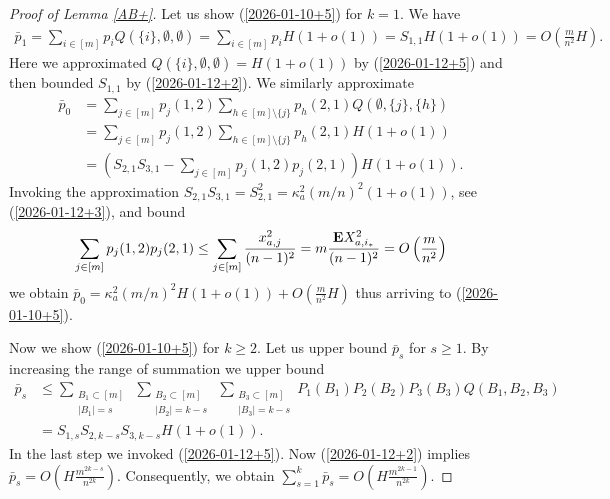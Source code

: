 \documentclass[10pt,a4paper]{amsart}
\newcommand{\E}{{\bf{E}}}
\begin{document}
\begin{proof}[ Proof of Lemma \ref{AB+}]
Let us show (\ref{2026-01-10+5}) for $k=1$. 
We have
\begin{align*}
{\bar p}_1
=
\sum_{i\in [m]}p_iQ(\{i\},\emptyset,\emptyset)
=
\sum_{i\in [m]}p_iH(1+o(1))
=
S_{1,1}H(1+o(1))
=
O\left(\frac{m}{n^2}H\right).
\end{align*}
Here we approximated $Q(\{i\},\emptyset,\emptyset)
=
H(1+o(1))$ by  (\ref{2026-01-12+5}) 
and then bounded $S_{1,1}$ by  (\ref{2026-01-12+2}).
We similarly approximate
\begin{align*}
{\bar p}_0
&
=
\sum_{j\in[m]}p_j(1,2)\sum_{h\in[m]\setminus\{j\}}p_h(2,1)Q(\emptyset,\{j\},\{h\})
\\
&
=
\sum_{j\in[m]}p_j(1,2)\sum_{h\in[m]\setminus\{j\}}p_h(2,1)H(1+o(1))
\\
&
=
\left(
S_{2,1}
S_{3,1}
-
\sum_{j\in[m]}p_j(1,2)p_j(2,1)
\right)
H(1+o(1)).
\end{align*}
Invoking the approximation $S_{2,1}S_{3,1}=S_{2,1}^2
=\kappa_a^2(m/n)^2(1+o(1))$, see (\ref{2026-01-12+3}), and bound
\begin{align*}
\sum_{j\in[m]}p_j(1,2)p_j(2,1)
\le \sum_{j\in[m]}\frac{x_{a,j}^2}{(n-1)^2}
=
m\frac{\E X_{a,i_*}^2}{(n-1)^2}
=
O\left(\frac{m}{n^2}\right)
\end{align*}
we obtain 
${\bar p}_0
=
\kappa_a^2(m/n)^2H(1+o(1))+O\left(\frac{m}{n^2}H\right)$
thus arriving to  (\ref{2026-01-10+5}).


Now  we show (\ref{2026-01-10+5}) for $k\ge 2$. 
Let us upper bound ${\bar p}_s$ for $s\ge 1$.
By increasing the range of summation we upper bound
\begin{align*}
{\bar p}_s
&
\le
\sum_
{\substack{B_1\subset [m]\\ |B_1|=s}}
\
\sum_{\substack{B_2\subset [m]\\
|B_2|=k-s}}
\
\sum_{\substack{B_3\subset [m]\\
|B_3|=k-s}}
P_1(B_1)P_2(B_2)P_3(B_3)Q(B_1,B_2,B_3)
\\
&
=
S_{1,s}S_{2,k-s}S_{3,k-s}H(
1+o(1)).
\end{align*}
In the last step we invoked (\ref{2026-01-12+5}).
Now (\ref{2026-01-12+2}) implies
${\bar p}_s=O\left(H\frac{m^{2k-s}}{n^{2k}}\right)$. 
Consequently, we obtain 
$\sum_{s=1}^k{\bar p}_s
=O\left(H\frac{m^{2k-1}}{n^{2k}}\right)$.


\end{proof}
\end{document}
